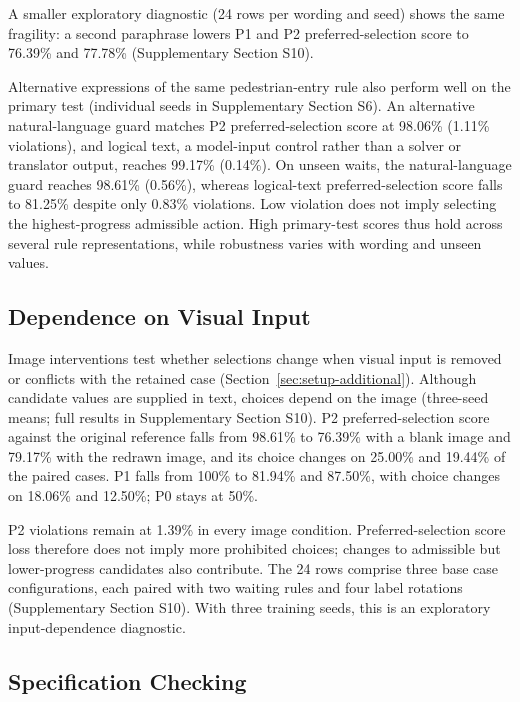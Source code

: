 A smaller exploratory diagnostic (24 rows per wording and seed) shows the same
fragility: a second paraphrase lowers P1 and P2 preferred-selection score to 76.39\% and 77.78\%
(Supplementary Section S10).

Alternative expressions of the same pedestrian-entry rule also perform well
on the primary test (individual seeds in Supplementary Section S6). An
alternative natural-language guard matches P2 preferred-selection score at
98.06\% (1.11\% violations), and logical text, a model-input control rather
than a solver or translator output, reaches 99.17\% (0.14\%). On unseen waits,
the natural-language guard reaches 98.61\% (0.56\%), whereas logical-text
preferred-selection score falls to 81.25\% despite only 0.83\% violations.
Low violation does not imply selecting the highest-progress admissible action.
High primary-test scores thus hold across several rule representations,
while robustness varies with wording and unseen values.

\subsection{Dependence on Visual Input}\label{sec:results-visual}

Image interventions test whether selections change when visual input is
removed or conflicts with the retained case
(Section~\ref{sec:setup-additional}). Although candidate values are supplied
in text, choices depend on the image (three-seed means; full results in
Supplementary Section S10). P2 preferred-selection score against the original
reference falls from 98.61\% to 76.39\% with a blank image and 79.17\% with the
redrawn image, and its choice changes on 25.00\% and 19.44\% of the paired
cases. P1 falls from 100\% to 81.94\% and 87.50\%, with choice changes on
18.06\% and 12.50\%; P0 stays at 50\%.

P2 violations remain at 1.39\% in every image condition. Preferred-selection score loss
therefore does not imply more prohibited choices; changes to admissible but
lower-progress candidates also contribute. The 24 rows comprise three base case configurations, each paired with two
waiting rules and four label rotations (Supplementary Section S10). With
three training seeds, this is an exploratory input-dependence diagnostic.

\subsection{Specification Checking}\label{sec:results-checks}

